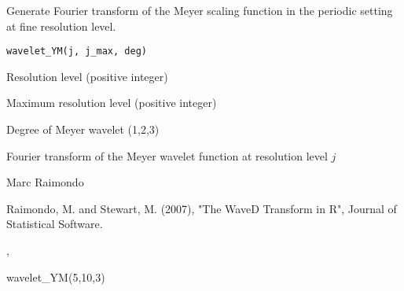 \begin{Description}\relax
Generate Fourier transform  of the Meyer scaling function in the periodic setting
at fine resolution level.
\end{Description}
\begin{Usage}
\begin{verbatim}
wavelet_YM(j, j_max, deg)
\end{verbatim}
\end{Usage}
\begin{Arguments}
\begin{ldescription}
\item[\code{j}] Resolution level (positive integer) 
\item[\code{j\_max}] Maximum resolution level (positive integer)
\item[\code{deg}] Degree of Meyer wavelet (1,2,3) 
\end{ldescription}
\end{Arguments}
\begin{Value}
Fourier transform  of the Meyer wavelet function at resolution level $j$
\end{Value}
\begin{Author}\relax
Marc Raimondo
\end{Author}
\begin{References}\relax
Raimondo, M. and Stewart, M. (2007),
"The WaveD Transform in R", Journal of Statistical Software.
\end{References}
\begin{SeeAlso}\relax
{},
\end{SeeAlso}
\begin{Examples}
\begin{ExampleCode}
wavelet_YM(5,10,3)
\end{ExampleCode}
\end{Examples}

